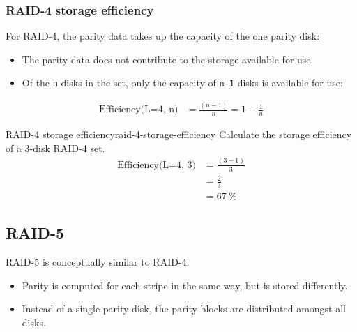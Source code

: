\documentclass[slides]{pgnotes}
\begin{document}
\subsubsection{RAID-4 storage efficiency}
\label{sec:raid-4-storage-efficiency}

For RAID-4, the parity data takes up the capacity of the one parity disk:
\begin{itemize}
\item The parity data does not contribute to the
  storage available for use.
\item Of the \texttt{n} disks in the set, only the capacity of \texttt{n-1} disks is available for use:
\end{itemize}
  
\begin{align}
  \mbox{Efficiency(L=4, n)} & =  \frac{( n - 1 )}{n}  =  1 - \frac{1}{n} \label{eq:raid-4-storage-efficiency}
\end{align}

\begin{example}{RAID-4 storage efficiency}{raid-4-storage-efficiency}
  Calculate the storage efficiency of a 3-disk RAID-4 set.
  \tcblower
\begin{align}
  \mbox{Efficiency(L=4, 3)} & =  \frac{( 3 - 1 )}{3}  \\
                            & = \frac{2}{3} \\
                            & = \SI{67}{\percent} 
\end{align}  
\end{example}


\subsection{RAID-5}
\label{sec:raid-5}

\begin{minipage}{0.39\linewidth}
  RAID-5 is conceptually similar to RAID-4:
  \begin{itemize}
  \item Parity is computed for each stripe in the same way, but is stored differently.
  \item Instead of a single parity disk, the parity blocks are distributed amongst all disks.
  \end{itemize}
\end{minipage}
\begin{minipage}{0.6\linewidth}
\end{minipage}
\end{document}
